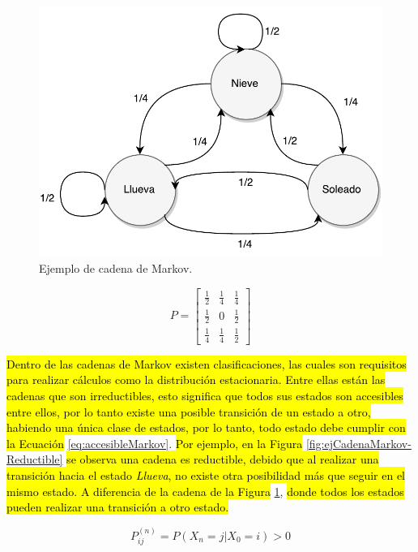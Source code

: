 \begin{figure}[ht!]
	\centering
	\includegraphics[scale=0.5]{images/EjCadenaMarkov.pdf}
	\caption{Ejemplo de cadena de Markov.}
	\label{fig:ejCadenaMarkov}
\end{figure}

\begin{equation} \label{eq:ejCadenaMarkov}
	P =
	\begin{bmatrix}
		\frac{1}{2} & \frac{1}{4} & \frac{1}{4} \\
		\frac{1}{2} & 0 & \frac{1}{2} \\
		\frac{1}{4} & \frac{1}{4} & \frac{1}{2}
	\end{bmatrix}	
\end{equation}

\hl{Dentro de las cadenas de Markov existen clasificaciones, las cuales son requisitos para realizar cálculos como la distribución estacionaria. Entre ellas están las cadenas que son irreductibles, esto significa que todos sus estados son accesibles entre ellos, por lo tanto existe una posible transición de un estado a otro, habiendo una única clase de estados, por lo tanto, todo estado debe cumplir con la Ecuación} \ref{eq:accesibleMarkov}. \hl{Por ejemplo, en la Figura} \ref{fig:ejCadenaMarkov-Reductible} \hl{se observa una cadena es reductible, debido que al realizar una transición hacia el estado \textit{Llueva}, no existe otra posibilidad más que seguir en el mismo estado. A diferencia de la cadena de la Figura} \ref{fig:ejCadenaMarkov}, \hl{donde todos los estados pueden realizar una transición a otro estado.}

\begin{equation} \label{eq:accesibleMarkov}
	P_{ij}^{(n)} = P(X_n = j | X_0 = i) > 0
\end{equation}

